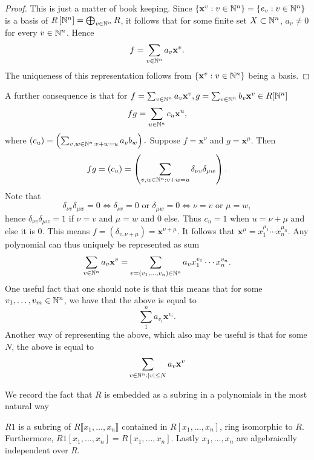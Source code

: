 \begin{proof}
    This is just a matter of book keeping. Since $\{\mathbf{x}^v : v \in \mathbb{N}^n \}=\{e_v : v\in \mathbb{N}^n\}$ is a basis of $R\left[ \mathbb{N}^n\right]=\bigoplus_{v\in \mathbb{N}^n} R$, it follows that for some finite set $X\subset \mathbb{N}^n$, $a_v \neq 0$ for every $v\in \mathbb{N}^n$. Hence 
    $$f = \sum_{v\in \mathbb{N}^n} a_v\mathbf{x}^v.$$
    The uniqueness of this representation follows from $\{\mathbf{x}^v : v \in \mathbb{N}^n \}$ being a basis.
\end{proof}
\begin{remark}
    A further consequence is that for $f=\sum_{v\in \mathbb{N}^n} a_v\mathbf{x}^v,g = \sum_{v\in \mathbb{N}^n} b_v\mathbf{x}^v\in R[\mathbb{N}^n]$
    $$fg = \sum_{u\in \mathbb{N}^n} c_u\mathbf{x}^u,$$
    where $(c_u) = \left(\sum_{v,w\in \mathbb{N}^n : v+w = u} a_vb_w\right).$
    Suppose $f = \mathbf{x}^\nu$ and $g = \mathbf{x}^\mu$. Then 
    $$fg = (c_u)= \left(\sum_{v,w\in \mathbb{N}^n : v+w = u} \delta_{\nu v}\delta_{\mu w} \right).$$
    Note that 
    $$\delta_{\nu v}\delta_{\mu w} = 0 \iff \delta_{\nu v} =0 \text{ or } \delta_{\mu w} = 0 \iff \nu = v \text{ or } \mu = w,$$
    hence $\delta_{\nu v}\delta_{\mu w} = 1$ if  $\nu = v \text{ and } \mu = w$ and $0$ else. Thus $c_u = 1$ when $u = \nu + \mu$ and else it is $0$. This means $f = (\delta_{v, \nu + \mu}) = \mathbf{x}^{\nu + \mu}$. It follows that $\mathbf{x}^\mu = x_1^{\mu_1}\cdots x_n^{\mu_n}$. Any polynomial can thus uniquely be represented as sum
    $$\sum_{v\in \mathbb{N}^n} a_v\mathbf{x}^v =\sum_{v=(v_1,\dots,v_n)\in \mathbb{N}^n} a_vx_1^{v_1}\cdots x_n^{v_n}.$$
    One useful fact that one should note is that this means that for some $v_1,\dots,v_m\in \mathbb{N}^n$, we have that the above is equal to
    $$\sum_1^n a_{v_i}\mathbf{x}^{v_i}.$$
    Another way of representing the above, which also may be useful is that for some $N$, the above is equal to
    $$\sum_{v\in \mathbb{N}^n : \vert v \vert \leq N} a_v\mathbf{x}^v $$
\end{remark}
We record the fact that $R$ is embedded as a subring in a polynomials in the most natural way
\begin{lemma}
   $R1$ is a subring of $R\llbracket  x_1,\dots,x_n\rrbracket$ contained in $R[x_1,\dots,x_n]$, ring isomorphic to $R$. Furthermore, $R1[x_1,\dots,x_n] = R[x_1,\dots,x_n]$. Lastly $x_1,\dots,x_n$ are algebraically independent over $R$. 
\end{lemma}
